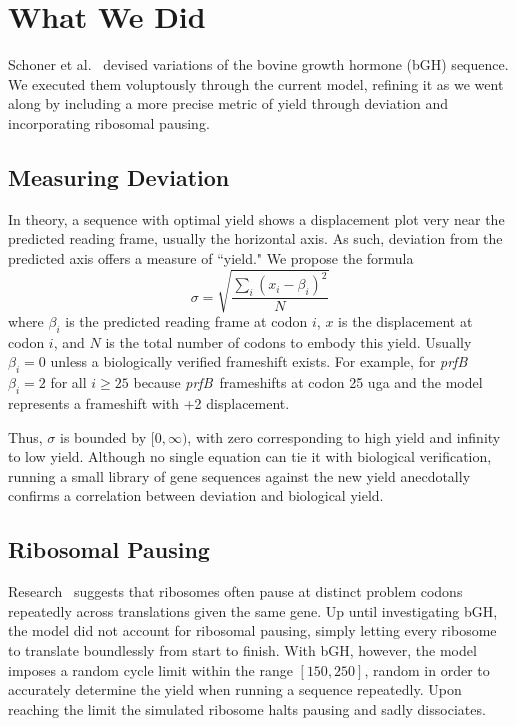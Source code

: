 \documentclass[10pt,twocolumn]{article}
\newcommand{\prfB}{\emph{prfB}}
\begin{document}
\section{What We Did}
\label{whatwedid}

Schoner et al.~\cite{schoner:bgh} devised variations of the bovine growth hormone (bGH) sequence.
We executed them voluptously through the current model, refining it as we went along by including
a more precise metric of yield through deviation and incorporating ribosomal pausing.

\subsection{Measuring Deviation}
\label{whatwedid:lbd}

In theory, a sequence with optimal yield shows a displacement plot very near the predicted reading frame,
usually the horizontal axis. As such, deviation from the predicted axis offers a measure of ``yield."
We propose the formula
\begin{equation}
    \label{eqn:lbd}
    \sigma = \sqrt{\frac{\sum_i \left(x_i - \beta_i\right)^2}{N}}
\end{equation}
where $\beta_i$ is the predicted reading frame at codon $i$, $x$ is the displacement at codon $i$,
and $N$ is the total number of codons to embody this yield. Usually $\beta_i = 0$ unless a biologically verified frameshift exists. For example, for \prfB\ $\beta_i = 2$ for all $i \geq 25$ because \prfB\ frameshifts at codon 25 uga
and the model represents a frameshift with +2 displacement.

Thus, $\sigma$ is bounded by $[0,\infty)$, with zero corresponding to high yield and infinity to low yield.
Although no single equation can tie it with biological verification, running a small library of gene sequences
against the new yield anecdotally confirms a correlation between deviation and biological yield.

\subsection{Ribosomal Pausing}
\label{rp}

Research~\cite{gowri:pause} suggests that ribosomes often pause at distinct problem codons repeatedly
across translations given the same gene. Up until investigating bGH, the model did not
account for ribosomal pausing, simply letting every ribosome to translate boundlessly from start to finish. With
bGH, however, the model imposes a random cycle limit within the range $[150,250]$, random in order to accurately
determine the yield when running a sequence repeatedly. Upon reaching the limit the simulated ribosome
halts pausing and sadly dissociates.
\end{document}

